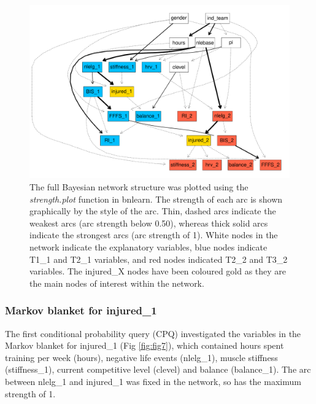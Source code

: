 \documentclass[
  english,
  man]{apa6}
\begin{document}
\begin{figure}
\centering
\includegraphics{manuscript_files/figure-latex/fig6-1.pdf}
\caption{\label{fig:fig6}The full Bayesian network structure was plotted using the \emph{strength.plot} function in bnlearn. The strength of each arc is shown graphically by the style of the arc. Thin, dashed arcs indicate the weakest arcs (arc strength below 0.50), whereas thick solid arcs indicate the strongest arcs (arc strength of 1). White nodes in the network indicate the explanatory variables, blue nodes indicate T1\_1 and T2\_1 variables, and red nodes indicated T2\_2 and T3\_2 variables. The injured\_X nodes have been coloured gold as they are the main nodes of interest within the network.}
\end{figure}

\hypertarget{markov-blanket-for-injured_1}{%
\subsubsection{Markov blanket for injured\_1}\label{markov-blanket-for-injured_1}}

The first conditional probability query (CPQ) investigated the variables in the Markov blanket for injured\_1 (Fig \ref{fig:fig7}), which contained hours spent training per week (hours), negative life events (nlelg\_1), muscle stiffness (stiffness\_1), current competitive level (clevel) and balance (balance\_1).
The arc between nlelg\_1 and injured\_1 was fixed in the network, so has the maximum strength of 1.
\end{document}
